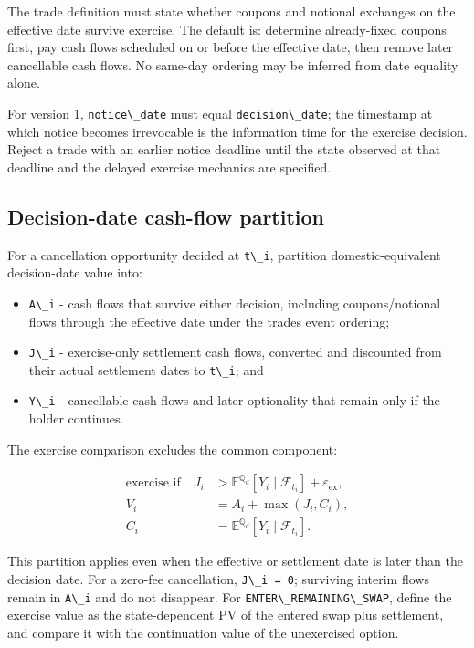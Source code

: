 \documentclass[conference]{IEEEtran}
\newcommand{\passthrough}[1]{#1}
\providecommand{\tightlist}{}
\begin{document}
The trade definition must state whether coupons and notional exchanges
on the effective date survive exercise. The default is: determine
already-fixed coupons first, pay cash flows scheduled on or before the
effective date, then remove later cancellable cash flows. No same-day
ordering may be inferred from date equality alone.

For version 1, \passthrough{\lstinline!notice\_date!} must equal
\passthrough{\lstinline!decision\_date!}; the timestamp at which notice
becomes irrevocable is the information time for the exercise decision.
Reject a trade with an earlier notice deadline until the state observed
at that deadline and the delayed exercise mechanics are specified.

\subsection{Decision-date cash-flow
partition}\label{25-decision-date-cash-flow-partition}

For a cancellation opportunity decided at
\passthrough{\lstinline!t\_i!}, partition domestic-equivalent
decision-date value into:

\begin{itemize}
\tightlist
\item
  \passthrough{\lstinline!A\_i!} - cash flows that survive either
  decision, including coupons/notional flows through the effective date
  under the trade\textquotesingle s event ordering;
\item
  \passthrough{\lstinline!J\_i!} - exercise-only settlement cash flows,
  converted and discounted from their actual settlement dates to
  \passthrough{\lstinline!t\_i!}; and
\item
  \passthrough{\lstinline!Y\_i!} - cancellable cash flows and later
  optionality that remain only if the holder continues.
\end{itemize}

The exercise comparison excludes the common component:

\begin{align*}
  \text{exercise if}\quad
  J_i &> \mathbb{E}^{\mathbb{Q}_d}\!\left[Y_i\mid\mathcal{F}_{t_i}\right]
        + \varepsilon_{\mathrm{ex}}, \\
  V_i &= A_i + \max\!\left(J_i,C_i\right), \\
  C_i &= \mathbb{E}^{\mathbb{Q}_d}\!\left[Y_i\mid\mathcal{F}_{t_i}\right].
\end{align*}

This partition applies even when the effective or settlement date is
later than the decision date. For a zero-fee cancellation,
\passthrough{\lstinline!J\_i = 0!}; surviving interim flows remain in
\passthrough{\lstinline!A\_i!} and do not disappear. For
\passthrough{\lstinline!ENTER\_REMAINING\_SWAP!}, define the exercise
value as the state-dependent PV of the entered swap plus settlement, and
compare it with the continuation value of the unexercised option.
\end{document}
